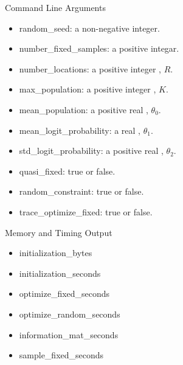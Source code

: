\documentclass{beamer}
\begin{document}
\begin{frame}{Command Line Arguments}
\fontsize{10}{11}\selectfont
\begin{itemize}

\item
random\_seed: \hspace{4em} a non-negative integer.
\pause

\item
number\_fixed\_samples: \hspace{0.2em} a positive integar.
\pause

\item
number\_locations: \hspace{2em} a positive integer , $R$.
\pause

\item
max\_population: \hspace{2.7em} a positive integer , $K$.
\pause

\item
mean\_population: \hspace{2.2em} a positive real , $\theta_0$.
\pause

\item
mean\_logit\_probability: \hspace{0em} a real , $\theta_1$.
\pause

\item
std\_logit\_probability: \hspace{1em} a positive real , $\theta_2$.
\pause

\item
quasi\_fixed: \hspace{4.8em} true or false.
\pause

\item
random\_constraint: \hspace{1.6em} true or false.
\pause

\item
trace\_optimize\_fixed: \hspace{1em} true or false.
\pause

\end{itemize}
\end{frame}

\begin{frame}{Memory and Timing Output}
\begin{itemize}

\item
initialization\_bytes
\pause

\item
initialization\_seconds
\pause

\item
optimize\_fixed\_seconds
\pause

\item
optimize\_random\_seconds
\pause

\item
information\_mat\_seconds
\pause

\item
sample\_fixed\_seconds
\pause

\end{itemize}
\end{frame}
\end{document}
